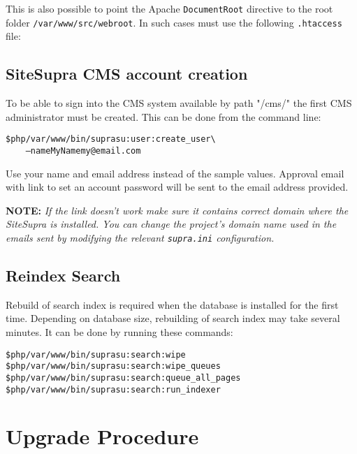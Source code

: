 \documentclass[12pt]{article}
\newcommand{\vigShowNotes}{1}
\newcommand{\vigPathToProject}{/var/www}
\newcommand{\vigPathToSrc}{/src}
\newcommand{\vigPathToWebroot}{\vigPathToSrc/webroot}
\newcommand{\note}[1]{
\textbf{NOTE:} 
\textit{#1}
}
\begin{document}
This is also possible to point the Apache \texttt{DocumentRoot} directive to the root folder \texttt{\vigPathToProject\vigPathToWebroot}. In such cases must use the following \texttt{.htaccess} file:

\begin{alltt}

\end{alltt}

\subsection{SiteSupra CMS account creation}

To be able to sign into the CMS system available by path "/cms/" the first CMS administrator must be created. This can be done from the command line:

\begin{alltt}
\$ php /var/www/bin/supra su:user:create_user \textbackslash
\ \ \ \ --name MyName my@email.com
\end{alltt}

Use your name and email address instead of the sample values. 
Approval email with link to set an account password will be sent to the email address provided.

\note{If the link doesn't work make sure it contains correct domain where the SiteSupra is installed. You can change the project's domain name used in the emails sent by modifying the relevant \texttt{supra.ini} configuration.}

\subsection{Reindex Search\label{reindexSearch}}
Rebuild of search index is required when the database is installed for the first time. Depending on database size, rebuilding of search index may take several minutes. It can be done by running these commands:

\begin{alltt}
\$ php \vigPathToProject/bin/supra su:search:wipe
\$ php \vigPathToProject/bin/supra su:search:wipe_queues
\$ php \vigPathToProject/bin/supra su:search:queue_all_pages
\$ php \vigPathToProject/bin/supra su:search:run_indexer
\end{alltt}

\section{Upgrade Procedure}
\end{document}
